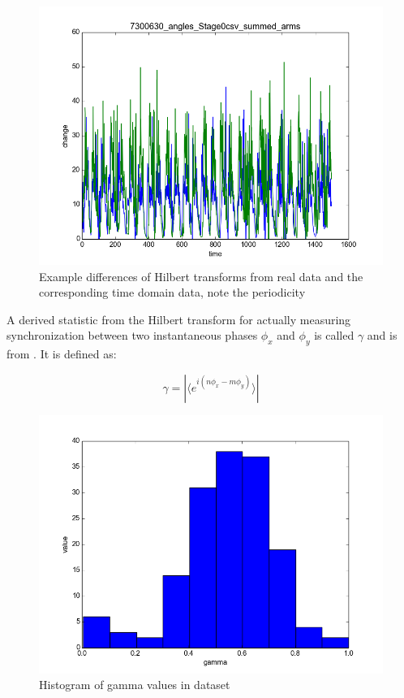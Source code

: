 \documentclass[12pt]{article}
\begin{document}
\begin{figure}
  \includegraphics[scale=0.4]{time_2}
  \caption{Example differences of Hilbert transforms from real data and the corresponding time domain data, note the periodicity}
  \label{fig:hilbert_plots}
\end{figure}

A derived statistic from the Hilbert transform for actually measuring synchronization between two instantaneous phases $\phi_x$ and $\phi_y$ is called $\gamma$ and is from \cite{gamma}. It is defined as:

$$ \gamma = |\langle e^{i(n\phi_x - m\phi_y)} \rangle| $$

\begin{figure}
  \centering
  \includegraphics[scale=0.6]{total_gammas}
  \caption{Histogram of gamma values in dataset}
  \label{fig:total_gammas}
\end{figure}
\end{document}
